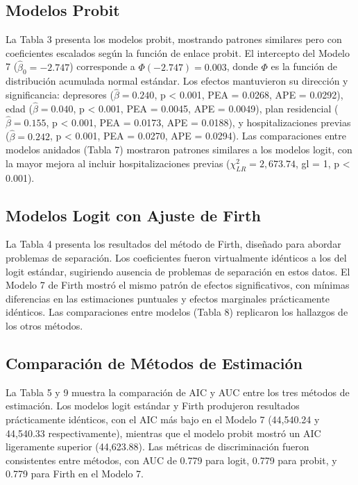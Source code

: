 \documentclass[
  spanish,
  10pt,
]{article}
\begin{document}
\subsection{Modelos Probit}\label{modelos-probit}

La Tabla 3 presenta los modelos probit, mostrando patrones similares
pero con coeficientes escalados según la función de enlace probit. El
intercepto del Modelo 7 (\(\hat{\beta}_0 = -2.747\)) corresponde a
\(\Phi(-2.747) = 0.003\), donde \(\Phi\) es la función de distribución
acumulada normal estándar. Los efectos mantuvieron su dirección y
significancia: depresores (\(\hat{\beta} = 0.240\), p \textless{} 0.001,
PEA = 0.0268, APE = 0.0292), edad (\(\hat{\beta} = 0.040\), p
\textless{} 0.001, PEA = 0.0045, APE = 0.0049), plan residencial
(\(\hat{\beta} = 0.155\), p \textless{} 0.001, PEA = 0.0173, APE =
0.0188), y hospitalizaciones previas (\(\hat{\beta} = 0.242\), p
\textless{} 0.001, PEA = 0.0270, APE = 0.0294). Las comparaciones entre
modelos anidados (Tabla 7) mostraron patrones similares a los modelos
logit, con la mayor mejora al incluir hospitalizaciones previas
(\(\chi^2_{LR} = 2,673.74\), gl = 1, p \textless{} 0.001).

\subsection{Modelos Logit con Ajuste de
Firth}\label{modelos-logit-con-ajuste-de-firth}

La Tabla 4 presenta los resultados del método de Firth, diseñado para
abordar problemas de separación. Los coeficientes fueron virtualmente
idénticos a los del logit estándar, sugiriendo ausencia de problemas de
separación en estos datos. El Modelo 7 de Firth mostró el mismo patrón
de efectos significativos, con mínimas diferencias en las estimaciones
puntuales y efectos marginales prácticamente idénticos. Las
comparaciones entre modelos (Tabla 8) replicaron los hallazgos de los
otros métodos.

\subsection{Comparación de Métodos de
Estimación}\label{comparaciuxf3n-de-muxe9todos-de-estimaciuxf3n}

La Tabla 5 y 9 muestra la comparación de AIC y AUC entre los tres
métodos de estimación. Los modelos logit estándar y Firth produjeron
resultados prácticamente idénticos, con el AIC más bajo en el Modelo 7
(44,540.24 y 44,540.33 respectivamente), mientras que el modelo probit
mostró un AIC ligeramente superior (44,623.88). Las métricas de
discriminación fueron consistentes entre métodos, con AUC de 0.779 para
logit, 0.779 para probit, y 0.779 para Firth en el Modelo 7.
\end{document}
